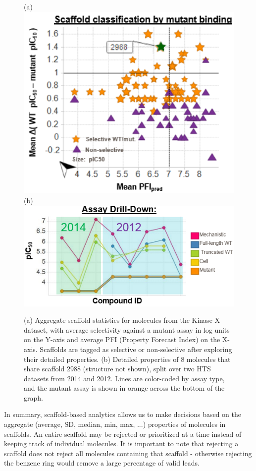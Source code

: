 \documentclass[journal=jacsat,biochem,manuscript=article]{achemso}
\begin{document}
\begin{figure}
  (a)\includegraphics[width=5in]{fig/KinaseX_RG_aggr.png}\\
  (b)\includegraphics[width=5in]{fig/KinaseX_RG_drill.png}
  \caption{(a) Aggregate scaffold statistics for molecules from the Kinase X dataset, with average selectivity against a mutant assay in log units on the Y-axis and average PFI (Property Forecast Index) on the X-axis.  Scaffolds are tagged as selective or non-selective after exploring their detailed properties. (b) Detailed properties of 8 molecules that share scaffold 2988 (structure not shown), split over two HTS datasets from 2014 and 2012. Lines are color-coded by assay type, and the mutant assay is shown in orange across the bottom of the graph.   
  }
\label{fig:KinaseX}   
\end{figure}

In summary, scaffold-based analytics allows us to make decisions based on the aggregate (average, SD, median, min, max, ...) properties of molecules in scaffolds. An entire scaffold may be rejected or prioritized at a time instead of keeping track of individual molecules. It is important to note that rejecting a scaffold does not reject all molecules containing that scaffold - otherwise rejecting the benzene ring would remove a large percentage of valid leads.
\end{document}
